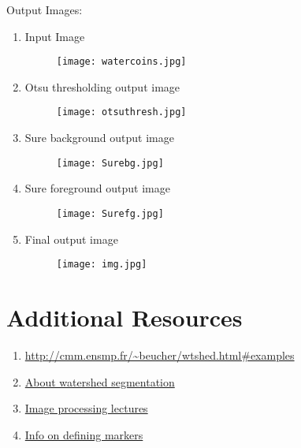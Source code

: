 \documentclass[]{article}
\providecommand{\tightlist}{%
  \setlength{\itemsep}{0pt}\setlength{\parskip}{0pt}}
\begin{document}


\newpage
Output Images:

\begin{enumerate}
\def\labelenumi{\arabic{enumi})}
\item Input Image\\
   \begin{figure}[h]
   	\texttt{[image: watercoins.jpg]}
   \end{figure}
\newpage
\item Otsu thresholding output image\\
\begin{figure}[h]
	\texttt{[image: otsuthresh.jpg]}
\end{figure}
\newpage
\item Sure background output image\\
  \begin{figure}[h]
  	\texttt{[image: Surebg.jpg]}
  \end{figure}
\newpage
\item Sure foreground output image\\
  \begin{figure}[h]
	\texttt{[image: Surefg.jpg]}
  \end{figure}

\newpage   
\item
  Final output image\\
  \begin{figure}[h]
  	\texttt{[image: img.jpg]}
  \end{figure}
  
\end{enumerate}
\newpage
\section{Additional Resources}\label{additional-resources}

\begin{enumerate}
\def\labelenumi{\arabic{enumi})}
\tightlist
\item \url{http://cmm.ensmp.fr/~beucher/wtshed.html\#examples}
\item \href{http://opencv-python-tutroals.readthedocs.org/en/latest/py
\_tutorials/py\_imgproc/py\_watershed/py\_watershed.html\#watershed}{About watershed segmentation}
\item \href{https://www.cs.auckland.ac.nz/courses/compsci773s1c/lectures
/ImageProcessing-html/topic3.htm}{Image processing lectures}
\item \href{http://stackoverflow.com/questions/11294859 \\ /how-to-define-the-markers-for-watershed-in-opencv}{Info on defining markers}
\end{enumerate}
\end{document}
